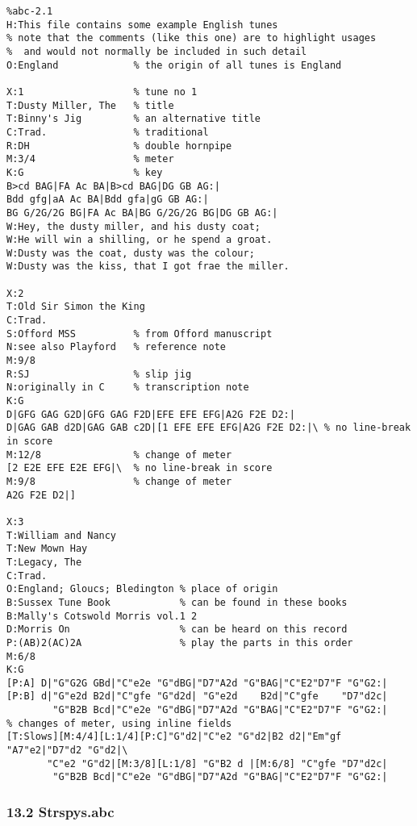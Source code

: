 \begin{verbatim}
%abc-2.1
H:This file contains some example English tunes
% note that the comments (like this one) are to highlight usages
%  and would not normally be included in such detail
O:England             % the origin of all tunes is England

X:1                   % tune no 1
T:Dusty Miller, The   % title
T:Binny's Jig         % an alternative title
C:Trad.               % traditional
R:DH                  % double hornpipe
M:3/4                 % meter
K:G                   % key
B>cd BAG|FA Ac BA|B>cd BAG|DG GB AG:|
Bdd gfg|aA Ac BA|Bdd gfa|gG GB AG:|
BG G/2G/2G BG|FA Ac BA|BG G/2G/2G BG|DG GB AG:|
W:Hey, the dusty miller, and his dusty coat;
W:He will win a shilling, or he spend a groat.
W:Dusty was the coat, dusty was the colour;
W:Dusty was the kiss, that I got frae the miller.

X:2
T:Old Sir Simon the King
C:Trad.
S:Offord MSS          % from Offord manuscript
N:see also Playford   % reference note
M:9/8
R:SJ                  % slip jig
N:originally in C     % transcription note
K:G
D|GFG GAG G2D|GFG GAG F2D|EFE EFE EFG|A2G F2E D2:|
D|GAG GAB d2D|GAG GAB c2D|[1 EFE EFE EFG|A2G F2E D2:|\ % no line-break in score
M:12/8                % change of meter
[2 E2E EFE E2E EFG|\  % no line-break in score
M:9/8                 % change of meter
A2G F2E D2|]

X:3
T:William and Nancy
T:New Mown Hay
T:Legacy, The
C:Trad.
O:England; Gloucs; Bledington % place of origin
B:Sussex Tune Book            % can be found in these books
B:Mally's Cotswold Morris vol.1 2
D:Morris On                   % can be heard on this record
P:(AB)2(AC)2A                 % play the parts in this order
M:6/8
K:G                        
[P:A] D|"G"G2G GBd|"C"e2e "G"dBG|"D7"A2d "G"BAG|"C"E2"D7"F "G"G2:|
[P:B] d|"G"e2d B2d|"C"gfe "G"d2d| "G"e2d    B2d|"C"gfe    "D7"d2c|
        "G"B2B Bcd|"C"e2e "G"dBG|"D7"A2d "G"BAG|"C"E2"D7"F "G"G2:|
% changes of meter, using inline fields
[T:Slows][M:4/4][L:1/4][P:C]"G"d2|"C"e2 "G"d2|B2 d2|"Em"gf "A7"e2|"D7"d2 "G"d2|\
       "C"e2 "G"d2|[M:3/8][L:1/8] "G"B2 d |[M:6/8] "C"gfe "D7"d2c|
        "G"B2B Bcd|"C"e2e "G"dBG|"D7"A2d "G"BAG|"C"E2"D7"F "G"G2:|
\end{verbatim}

\hypertarget{strspysabc}{\subsubsection{13.2
Strspys.abc}\label{strspysabc}}

